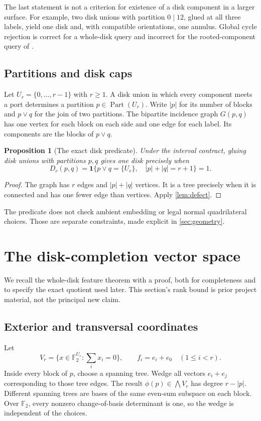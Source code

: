 \documentclass[11pt,a4paper]{article}
\newtheorem{proposition}[proposition]{Proposition}
\theoremstyle{definition}
\newcommand{\F}{\mathbb F_2}
\newcommand{\Part}{\operatorname{Part}}
\newcommand{\ind}[1]{\mathbf 1\{#1\}}
\begin{document}
The last statement is not a criterion for existence of a disk component in a larger surface. For example, two disk unions with partition $0\mid12$, glued at all three labels, yield one disk and, with compatible orientations, one annulus. Global cycle rejection is correct for a whole-disk query and incorrect for the rooted-component query of \cite{rooted}.

\subsection{Partitions and disk caps}
Let $U_r=\{0,\ldots,r-1\}$ with $r\ge1$. A disk union in which every component meets a port determines a partition $p\in\Part(U_r)$. Write $|p|$ for its number of blocks and $p\vee q$ for the join of two partitions. The bipartite incidence graph $G(p,q)$ has one vertex for each block on each side and one edge for each label. Its components are the blocks of $p\vee q$.

\begin{proposition}[The exact disk predicate]\label{prop:disk}
Under the interval contract, gluing disk unions with partitions $p,q$ gives one disk precisely when
\begin{equation}
D_r(p,q)=\ind{p\vee q=\{U_r\},\quad |p|+|q|=r+1}=1.
\label{eq:disk}
\end{equation}
\end{proposition}
\begin{proof}
The graph has $r$ edges and $|p|+|q|$ vertices. It is a tree precisely when it is connected and has one fewer edge than vertices. Apply \cref{lem:defect}.
\end{proof}

The predicate does not check ambient embedding or legal normal quadrilateral choices. Those are separate constraints, made explicit in \cref{sec:geometry}.

\section{The disk-completion vector space}\label{sec:features}

We recall the whole-disk feature theorem with a proof, both for completeness and to specify the exact quotient used later. This section's rank bound is prior project material, not the principal new claim.

\subsection{Exterior and transversal coordinates}
Let
\[
V_r=\{x\in\F^{U_r}:\textstyle\sum_i x_i=0\},
\qquad f_i=e_i+e_0\quad(1\le i<r).
\]
Inside every block of $p$, choose a spanning tree. Wedge all vectors $e_i+e_j$ corresponding to those tree edges. The result $\phi(p)\in\bigwedge V_r$ has degree $r-|p|$. Different spanning trees are bases of the same even-sum subspace on each block. Over $\F$, every nonzero change-of-basis determinant is one, so the wedge is independent of the choices.
\end{document}
